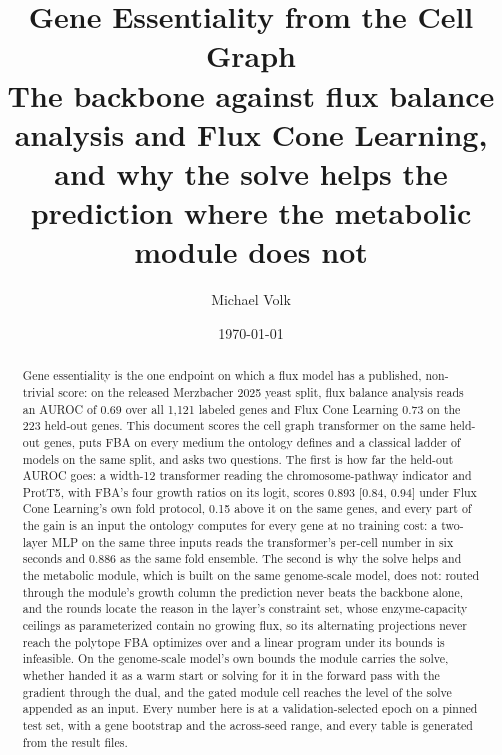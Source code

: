 \documentclass[10pt,a4paper]{article}
\title{\vspace{-1.5em}Gene Essentiality from the Cell Graph\\
  {\large The backbone against flux balance analysis and Flux Cone Learning,\\and why
  the solve helps the prediction where the metabolic module does not}}
\author{Michael Volk}
\date{\today}
\begin{document}
\maketitle
\thispagestyle{empty}

\begin{abstract}
\noindent
Gene essentiality is the one endpoint on which a flux model has a published, non-trivial
score: on the released Merzbacher 2025 yeast split, flux balance analysis reads an AUROC of
0.69 over all 1,121 labeled genes and Flux Cone Learning 0.73 on the 223 held-out genes.
This document scores the cell graph transformer on the same held-out genes, puts FBA on
every medium the ontology defines and a classical ladder of models on the same split, and
asks two questions. The first is how far the held-out AUROC goes: a width-12 transformer
reading the chromosome-pathway indicator and ProtT5, with FBA's four growth ratios on its
logit, scores 0.893 [0.84, 0.94] under Flux Cone Learning's own fold protocol, 0.15 above
it on the same genes, and every part of the gain is an input the ontology computes for
every gene at no training cost: a two-layer MLP on the same three inputs reads the
transformer's per-cell number in six seconds and 0.886 as the same fold ensemble. The
second is why the solve helps and the metabolic
module, which is built on the same genome-scale model, does not: routed through the
module's growth column the prediction never beats the backbone alone, and the rounds
locate the reason in the layer's constraint set, whose enzyme-capacity ceilings as
parameterized contain no growing flux, so its alternating projections never reach the
polytope FBA optimizes over and a linear program under its bounds is infeasible. On the
genome-scale model's own bounds the module carries the solve, whether handed it as a
warm start or solving for it in the forward pass with the gradient through the dual,
and the gated module cell reaches the level of the solve appended as an input. Every
number here is at a
validation-selected epoch on a pinned test set, with a gene bootstrap and the across-seed
range, and every table is generated from the result files.
\end{abstract}

\vspace{0.5em}
\tccontents
\clearpage










\end{document}
